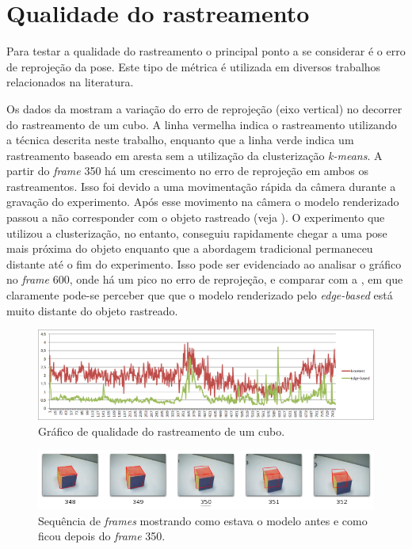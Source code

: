 \section{Qualidade do rastreamento}

Para testar a qualidade do rastreamento o principal ponto a se considerar é o erro de reprojeção da pose. Este tipo de métrica é utilizada em diversos trabalhos relacionados na literatura.

Os dados da  mostram a variação do erro de reprojeção (eixo vertical) no decorrer do rastreamento de um cubo. A linha vermelha indica o rastreamento utilizando a técnica descrita neste trabalho, enquanto que a linha verde indica um rastreamento baseado em aresta sem a utilização da clusterização \emph{k-means}. A partir do \emph{frame} 350 há um crescimento no erro de reprojeção em ambos os rastreamentos. Isso foi devido a uma movimentação rápida da câmera durante a gravação do experimento. Após esse movimento na câmera o modelo renderizado passou a não corresponder com o objeto rastreado (veja ). O experimento que utilizou a clusterização, no entanto, conseguiu rapidamente chegar a uma pose mais próxima do objeto enquanto que a abordagem tradicional permaneceu distante até o fim do experimento. Isso pode ser evidenciado ao analisar o gráfico no \emph{frame} 600, onde há um pico no erro de reprojeção, e comparar com a , em que claramente pode-se perceber que que o modelo renderizado pelo \emph{edge-based} está muito distante do objeto rastreado.

\begin{figure}[!ht]
\centering\includegraphics[width=\textwidth]{monografia/qualidade_cubo_real}
\caption{Gráfico de qualidade do rastreamento de um cubo.}
\label{qualidade_cubo_real}
\end{figure}

\begin{figure}[!ht]
\centering\includegraphics[width=\textwidth]{monografia/brusco_350}
\caption{Sequência de \emph{frames} mostrando como estava o modelo antes e como ficou depois do \emph{frame} 350.}
\label{brusco_350}
\end{figure}

